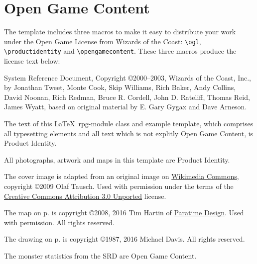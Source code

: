\documentclass[a4paper,serif]{rpg-module}
\begin{document}
%
%

\section{Open Game Content}
\label{ogl}

The template includes three macros to make it easy to distribute your work under the Open Game License
from Wizards of the Coast: \verb|\ogl|, \verb|\productidentity| and \verb|\opengamecontent|. These three
macros produce the license text below:

\begin{ogl}
\item System Reference Document, Copyright \copyright 2000--2003, Wizards of the Coast, Inc., by Jonathan Tweet, Monte Cook,
Skip Williams, Rich Baker, Andy Collins, David Noonan, Rich Redman, Bruce R. Cordell, John D. Rateliff, Thomas Reid, James
Wyatt, based on original material by E. Gary Gygax and Dave Arneson.
\end{ogl}

\begin{productidentity}
\item The text of this \LaTeX~rpg-module class and example template, which comprises all typesetting elements and all text which
is not explitly Open Game Content, is Product Identity.
\modulecopyright

\item All photographs, artwork and maps in this template are Product Identity.

\item The cover image is adapted from an original image on
\href{https://commons.wikimedia.org/wiki/File:Karnak_Tempel_Vorhof_05.jpg}{Wikimedia Commons}, copyright \copyright 2009 Olaf
Tausch. Used with permission under the terms of the
\href{https://creativecommons.org/licenses/by/3.0/deed.en}{Creative Commons Attribution 3.0 Unported} license.

\item The map on p.\pageref{img:map} is copyright \copyright 2008, 2016 Tim Hartin of \href{http://paratime.ca}{Paratime Design}.
Used with permission. All rights reserved.

\item The drawing on p.\pageref{img:tomb} is copyright \copyright 1987, 2016 Michael Davis. All rights reserved.
\end{productidentity}

\begin{opengamecontent}
\item The monster statistics from the SRD are Open Game Content.
\end{opengamecontent}

\newpage

%
%

\tableofcontents

\end{document}
